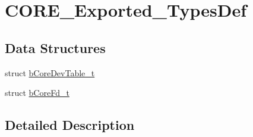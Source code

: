 \hypertarget{group___c_o_r_e___exported___types_def}{}\section{C\+O\+R\+E\+\_\+\+Exported\+\_\+\+Types\+Def}
\label{group___c_o_r_e___exported___types_def}
\subsection*{Data Structures}
\begin{DoxyCompactItemize}
\item 
struct \mbox{\hyperlink{structb_core_dev_table__t}{b\+Core\+Dev\+Table\+\_\+t}}
\item 
struct \mbox{\hyperlink{structb_core_fd__t}{b\+Core\+Fd\+\_\+t}}
\end{DoxyCompactItemize}


\subsection{Detailed Description}
